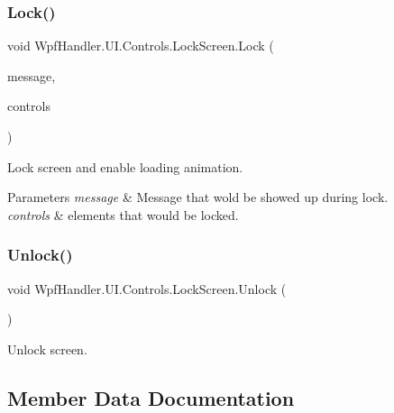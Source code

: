 \subsubsection{\texorpdfstring{Lock()}{Lock()}}
{\footnotesize\ttfamily void Wpf\+Handler.\+U\+I.\+Controls.\+Lock\+Screen.\+Lock (\begin{DoxyParamCaption}\item[{string}]{message,  }\item[{params Framework\+Element \mbox{[}$\,$\mbox{]}}]{controls }\end{DoxyParamCaption})}



Lock screen and enable loading animation. 


\begin{DoxyParams}{Parameters}
{\em message} & Message that wold be showed up during lock.\\
\hline
{\em controls} & elements that would be locked.\\
\hline
\end{DoxyParams}
\mbox{\label{class_wpf_handler_1_1_u_i_1_1_controls_1_1_lock_screen_a2411f98b2544601d6310967dc93064a2}} 
\subsubsection{\texorpdfstring{Unlock()}{Unlock()}}
{\footnotesize\ttfamily void Wpf\+Handler.\+U\+I.\+Controls.\+Lock\+Screen.\+Unlock (\begin{DoxyParamCaption}{ }\end{DoxyParamCaption})}



Unlock screen. 



\subsection{Member Data Documentation}
\mbox{\label{class_wpf_handler_1_1_u_i_1_1_controls_1_1_lock_screen_a5152e45504e88316e8d76753577ea4b5}} 
